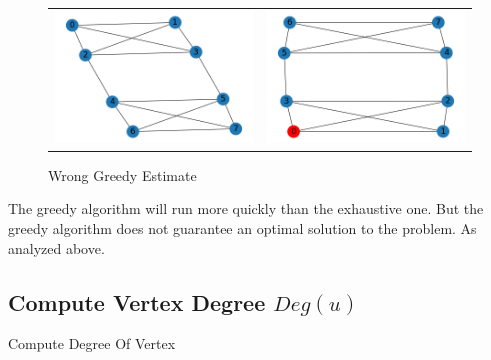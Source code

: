 \documentclass[longpaper, english, final, times]{revdetua}
\begin{document}
		\begin{figure}[h]
			\begin{tabular}{cc}
				\includegraphics[width=0.5\linewidth]{imgs/greedycont1.png} &   \includegraphics[width=0.5\linewidth]{imgs/greedycont2.png} \\
			\end{tabular}
			\caption{Wrong Greedy Estimate}
			\label{figure:greedysearchwrong1}
		\end{figure}
		
		The greedy algorithm will run more quickly than the exhaustive one. But the greedy algorithm does not guarantee an optimal solution to the problem. As analyzed above.
		
		\subsection{Compute Vertex Degree $Deg(u)$}
			\begin{algorithm}
				\caption{Compute Degree Of Vertex}
				\label{algotithm:GetVertexDegree}
				\DontPrintSemicolon
				
				
				
				
			\end{algorithm}
				
\end{document}
